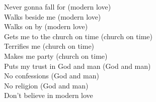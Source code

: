Never gonna fall for (modern love) \\
Walks beside me (modern love) \\
Walks on by (modern love) \\
Gets me to the church on time (church on time) \\
Terrifies me (church on time) \\
Makes me party (church on time) \\
Puts my trust in God and man (God and man) \\
No confessions (God and man) \\
No religion (God and man) \\
Don't believe in modern love \\

